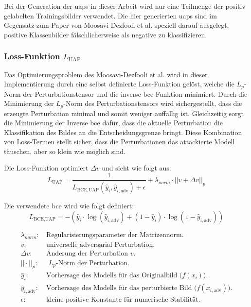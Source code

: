 Bei der Generation der \acrshort{uap}s in dieser Arbeit wird nur eine Teilmenge der positiv gelabelten Trainingsbilder verwendet. Die hier generierten \acrshort{uap}s sind im Gegensatz zum Paper von Moosavi-Dezfooli et al. \cite{moosavi-dezfooli_universal_2017} speziell darauf ausgelegt, positive Klassenbilder fälschlicherweise als negative zu klassifizieren. 

\newpage
\subsubsection{Loss-Funktion $L_{\text{UAP}}$}
Das Optimierungsproblem des Moosavi-Dezfooli et al. \cite{moosavi-dezfooli_universal_2017} wird in dieser Implementierung durch eine selbst definierte Loss-Funktion gelöst, welche die $L_p$-Norm der Perturbationstensor und die inverse \acrlong{bce} Funktion minimiert. Durch die Minimierung der $L_p$-Norm des Perturbationstensors wird sichergestellt, dass die erzeugte Perturbation minimal und somit weniger auffällig ist. Gleichzeitig sorgt die Minimierung der Inverse \acrlong{bce} dafür, dass die aktuelle Perturbation die Klassifikation des Bildes an die Entscheidungsgrenze bringt. Diese Kombination von Loss-Termen stellt sicher, dass die Perturbationen das attackierte Modell täuschen, aber so klein wie möglich sind.

Die Loss-Funktion optimiert $\Delta v$ und sieht wie folgt aus:
\begin{equation}
    L_{\text{UAP}} = \frac{1}{L_{\text{BCE,UAP}}(\hat{y}_i, \hat{y}_{i,\text{adv}}) + \epsilon} + \lambda_{norm} \cdot ||v + \Delta v||_p 
\label{Loss}
\end{equation}

Die verwendete \acrlong{bce} wird wie folgt definiert:
\begin{equation}
L_{\text{BCE,UAP}} = - (\hat{y}_i \cdot \log(\hat{y}_{i,\text{adv}}) + (1-\hat{y}_i) \cdot \log(1-\hat{y}_{i,\text{adv}}))
\label{eq:BCE_UAP}
\end{equation}

\begin{align*}
\lambda_{norm}\text{:} &\text{ Regularisierungsparameter der Matrizennorm.} \\
v\text{:} &\text{ universelle adversarial Perturbation.} \\
\Delta v\text{:} &\text{ Änderung der Perturbation } v \text{.} \\
||\cdot||_p\text{:} & \text{ $L_p$-Norm der Perturbation.} \\
\hat{y}_i\text{:} &\text{ Vorhersage des Modells für das Originalbild ($f(x_{i})$).} \\
\hat{y}_{i,\text{adv}}\text{:} &\text{ Vorhersage des Modells für das perturbierte Bild ($f(x_{i,\text{adv}})$).} \\
\epsilon\text{:} &\text{ kleine positive Konstante für numerische Stabilität.}
\end{align*}

